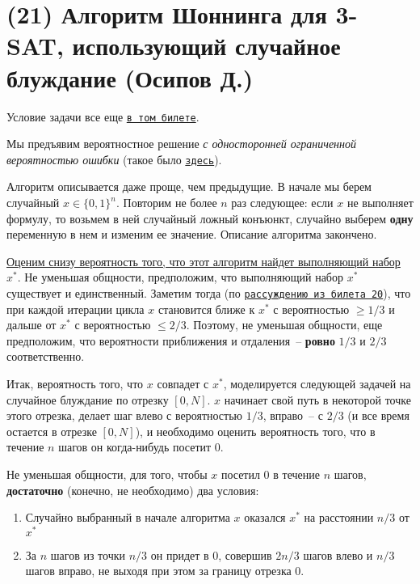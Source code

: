 \section{(21) Алгоритм Шоннинга для 3-SAT, использующий случайное блуждание (Осипов Д.)}

Условие задачи все еще \hyperlink{3sat}{\texttt{в том билете}}.

Мы предъявим вероятностное решение \textit{с односторонней ограниченной вероятностью ошибки} (такое было \hyperlink{Freivalds}{\texttt{здесь}}).


Алгоритм описывается даже проще, чем предыдущие. В начале мы берем случайный $x \in \{0, 1\}^n$. Повторим не более $n$ раз следующее: если $x$ не выполняет формулу, то возьмем в ней случайный ложный конъюнкт, случайно выберем \textbf{одну} переменную в нем и изменим ее значение. Описание алгоритма закончено.

\underline{Оценим снизу вероятность того, что этот алгоритм найдет выполняющий набор} $x^*$. Не уменьшая общности, предположим, что выполняющий набор $x^*$ существует и единственный. Заметим тогда (по \hyperlink{flip20}{\texttt{рассуждению из билета 20}}), что при каждой итерации цикла $x$ становится ближе к $x^*$ с вероятностью $\geq 1/3$ и дальше от $x^*$ с вероятностью $\leq 2/3$. Поэтому, не уменьшая общности, еще предположим, что вероятности приближения и отдаления~-- \textbf{ровно} $1/3$ и $2/3$ соответственно.

Итак, вероятность того, что $x$ совпадет с $x^*$, моделируется следующей задачей на случайное блуждание по отрезку $[0, N]$. $x$ начинает свой путь в некоторой точке этого отрезка, делает шаг влево с вероятностью $1/3$, вправо~-- с $2/3$ (и все время остается в отрезке $[0, N]$), и необходимо оценить вероятность того, что в течение $n$ шагов он когда-нибудь посетит 0.

Не уменьшая общности, для того, чтобы $x$ посетил 0 в течение $n$ шагов, \textbf{достаточно} (конечно, не необходимо) два условия:
\begin{enumerate}
    \item Случайно выбранный в начале алгоритма $x$ оказался $x^*$ на расстоянии $n/3$ от $x^*$
    \item За $n$ шагов из точки $n/3$ он придет в 0, совершив $2n/3$ шагов влево и $n/3$ шагов вправо, не выходя при этом за границу отрезка 0.
\end{enumerate}

